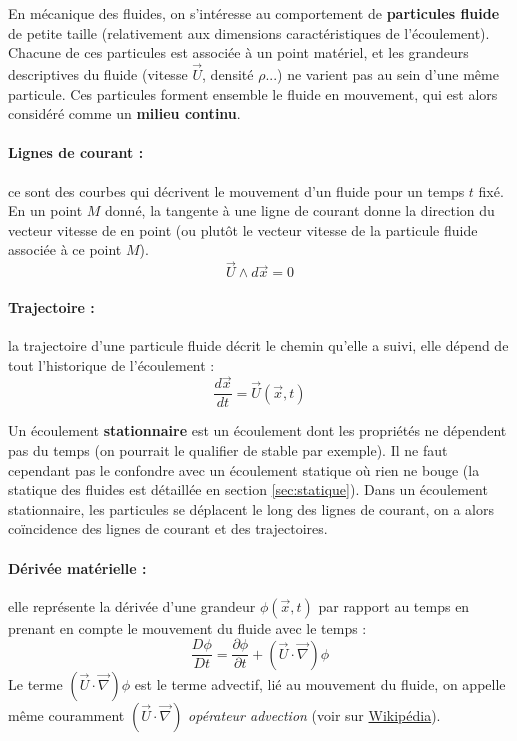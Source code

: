 
En mécanique des fluides, on s'intéresse au comportement de \textbf{particules fluide} de petite taille (relativement aux dimensions caractéristiques de l'écoulement). Chacune de ces particules est associée à un point matériel, et les grandeurs descriptives du fluide (vitesse $\vec{U}$, densité $\rho$...) ne varient pas au sein d'une même particule. Ces particules forment ensemble le fluide en mouvement, qui est alors considéré comme un \textbf{milieu continu}.

\paragraph{Lignes de courant :}ce sont des courbes qui décrivent le mouvement d'un fluide pour un temps $t$ fixé. En un point $M$ donné, la tangente à une ligne de courant donne la direction du vecteur vitesse de en point (ou plutôt le vecteur vitesse de la particule fluide associée à ce point $M$).
%
\begin{equation}
    \vec{U}\wedge d\vec{x}=0
\end{equation}

\paragraph{Trajectoire :}la trajectoire d'une particule fluide décrit le chemin qu'elle a suivi, elle dépend de tout l'historique de l'écoulement :
%
\begin{equation}
    \frac{d\vec{x}}{dt} = \vec{U}(\vec{x},t)
\end{equation}

Un écoulement \textbf{stationnaire} est un écoulement dont les propriétés ne dépendent pas du temps (on pourrait le qualifier de stable par exemple). Il ne faut cependant pas le confondre avec un écoulement statique où rien ne bouge (la statique des fluides est détaillée en section \ref{sec:statique}). Dans un écoulement stationnaire, les particules se déplacent le long des lignes de courant, on a alors coïncidence des lignes de courant et des trajectoires.

\paragraph{Dérivée matérielle :}elle représente la dérivée d'une grandeur $\phi(\vec{x},t)$ par rapport au temps en prenant en compte le mouvement du fluide avec le temps :
%
\begin{equation}
    \frac{D\phi}{Dt} = \frac{\partial{\phi}}{\partial{t}}
     + \left( \vec{U} \cdot \vec{\nabla} \right) \phi
\end{equation}
%
Le terme $\left( \vec{U} \cdot \vec{\nabla} \right) \phi$ est le terme advectif, lié au mouvement du fluide, on appelle même couramment $\left( \vec{U} \cdot \vec{\nabla} \right)$ \textit{opérateur advection} (voir sur \href{https://fr.wikipedia.org/wiki/Advection}{Wikipédia}).

